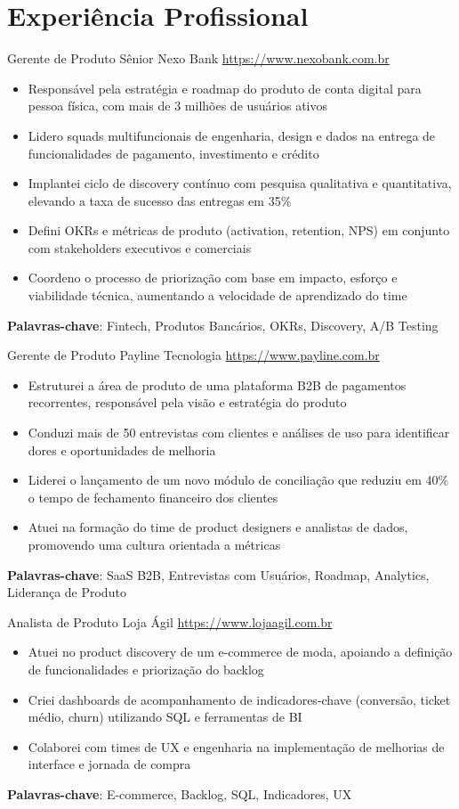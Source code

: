 \documentclass[a4paper, serif, 10pt]{moderncv}
\begin{document}
\section{Experiência Profissional}

        {Gerente de Produto Sênior}
        {Nexo Bank}
        {\url{https://www.nexobank.com.br}}
        {}
        {\begin{itemize}
\item Responsável pela estratégia e roadmap do produto de conta digital para pessoa física, com mais de 3 milhões de usuários ativos
\item Lidero squads multifuncionais de engenharia, design e dados na entrega de funcionalidades de pagamento, investimento e crédito
\item Implantei ciclo de discovery contínuo com pesquisa qualitativa e quantitativa, elevando a taxa de sucesso das entregas em 35\%
\item Defini OKRs e métricas de produto (activation, retention, NPS) em conjunto com stakeholders executivos e comerciais
\item Coordeno o processo de priorização com base em impacto, esforço e viabilidade técnica, aumentando a velocidade de aprendizado do time
\end{itemize}
\textbf{Palavras-chave}: Fintech, Produtos Bancários, OKRs, Discovery, A/B Testing}

        {Gerente de Produto}
        {Payline Tecnologia}
        {\url{https://www.payline.com.br}}
        {}
        {\begin{itemize}
\item Estruturei a área de produto de uma plataforma B2B de pagamentos recorrentes, responsável pela visão e estratégia do produto
\item Conduzi mais de 50 entrevistas com clientes e análises de uso para identificar dores e oportunidades de melhoria
\item Liderei o lançamento de um novo módulo de conciliação que reduziu em 40\% o tempo de fechamento financeiro dos clientes
\item Atuei na formação do time de product designers e analistas de dados, promovendo uma cultura orientada a métricas
\end{itemize}
\textbf{Palavras-chave}: SaaS B2B, Entrevistas com Usuários, Roadmap, Analytics, Liderança de Produto}

        {Analista de Produto}
        {Loja Ágil}
        {\url{https://www.lojaagil.com.br}}
        {}
        {\begin{itemize}
\item Atuei no product discovery de um e-commerce de moda, apoiando a definição de funcionalidades e priorização do backlog
\item Criei dashboards de acompanhamento de indicadores-chave (conversão, ticket médio, churn) utilizando SQL e ferramentas de BI
\item Colaborei com times de UX e engenharia na implementação de melhorias de interface e jornada de compra
\end{itemize}
\textbf{Palavras-chave}: E-commerce, Backlog, SQL, Indicadores, UX}
\end{document}
